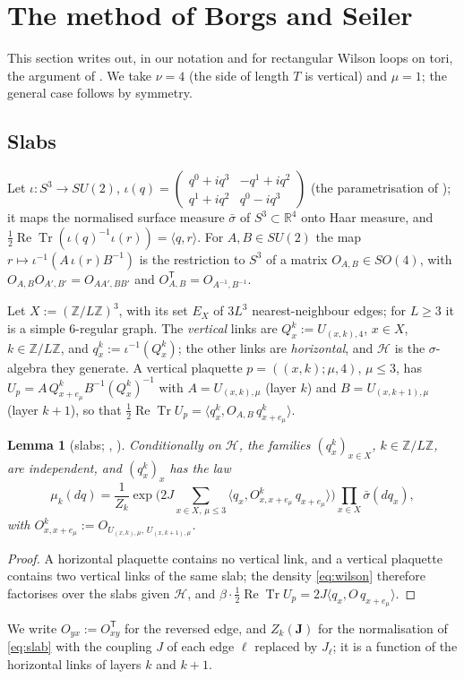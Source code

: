 \documentclass[11pt,a4paper]{article}
\theoremstyle{plain}
\newtheorem{lemma}[theorem]{Lemma}
\theoremstyle{remark}
\numberwithin{equation}{section}
\newcommand{\R}{\mathbb{R}}
\newcommand{\Z}{\mathbb{Z}}
\newcommand{\ReTr}{\operatorname{Re}\operatorname{Tr}}
\newcommand{\cH}{\mathcal{H}}
\newcommand{\bs}{\boldsymbol}
\begin{document}
\section{The method of Borgs and Seiler}\label{sec:bs}

This section writes out, in our notation and for rectangular Wilson loops on tori, the argument of \cite[Appendix~B]{BS83}. We take
$\nu=4$ (the side of length $T$ is vertical) and $\mu=1$; the general case follows by symmetry.

\subsection{Slabs}
Let $\iota:S^3\to SU(2)$, $\iota(q)=\begin{pmatrix}q^0+iq^3&-q^1+iq^2\\ q^1+iq^2&q^0-iq^3\end{pmatrix}$ (the parametrisation of
\cite[(5.1)]{DF80}); it maps the normalised surface measure $\bar\sigma$ of $S^3\subset\R^4$ onto Haar measure, and
$\frac12\ReTr(\iota(q)^{-1}\iota(r))=\langle q,r\rangle$. For $A,B\in SU(2)$ the map $r\mapsto\iota^{-1}(A\,\iota(r)B^{-1})$ is the
restriction to $S^3$ of a matrix $O_{A,B}\in SO(4)$, with $O_{A,B}O_{A',B'}=O_{AA',BB'}$ and $O_{A,B}^{\mathsf T}=O_{A^{-1},B^{-1}}$.

Let $X:=(\Z/L\Z)^3$, with its set $E_X$ of $3L^3$ nearest-neighbour edges; for $L\ge3$ it is a simple $6$-regular graph. The
\emph{vertical} links are $Q^k_x:=U_{(x,k),4}$, $x\in X$, $k\in\Z/L\Z$, and $q^k_x:=\iota^{-1}(Q^k_x)$; the other links are
\emph{horizontal}, and $\cH$ is the $\sigma$-algebra they generate. A vertical plaquette $p=((x,k);\mu,4)$, $\mu\le3$, has
$U_p=A\,Q^k_{x+e_\mu}B^{-1}(Q^k_x)^{-1}$ with $A=U_{(x,k),\mu}$ (layer $k$) and $B=U_{(x,k+1),\mu}$ (layer $k+1$), so that
$\frac12\ReTr U_p=\langle q^k_x,O_{A,B}\,q^k_{x+e_\mu}\rangle$.

\begin{lemma}[slabs; {\cite[(1.17)--(1.19)]{DF80}}, {\cite[Lemma~7.4]{D7}}]\label{lem:slab}
Conditionally on $\cH$, the families $(q^k_x)_{x\in X}$, $k\in\Z/L\Z$, are independent, and $(q^k_x)_x$ has the law
\begin{equation}\label{eq:slab}
\mu_k(dq)=\frac1{Z_k}\exp\Big(2J\sum_{x\in X,\,\mu\le3}\langle q_x,O^k_{x,x+e_\mu}\,q_{x+e_\mu}\rangle\Big)\prod_{x\in X}\bar\sigma(dq_x),
\end{equation}
with $O^k_{x,x+e_\mu}:=O_{U_{(x,k),\mu},\,U_{(x,k+1),\mu}}$.
\end{lemma}
\begin{proof}
A horizontal plaquette contains no vertical link, and a vertical plaquette contains two vertical links of the same slab; the density
\eqref{eq:wilson} therefore factorises over the slabs given $\cH$, and $\beta\cdot\frac12\ReTr U_p=2J\langle q_x,O\,q_{x+e_\mu}\rangle$.
\end{proof}
\noindent We write $O_{yx}:=O_{xy}^{\mathsf T}$ for the reversed edge, and $Z_k(\bs J)$ for the normalisation of \eqref{eq:slab} with
the coupling $J$ of each edge $\ell$ replaced by $J_\ell$; it is a function of the horizontal links of layers $k$ and $k+1$.
\end{document}
